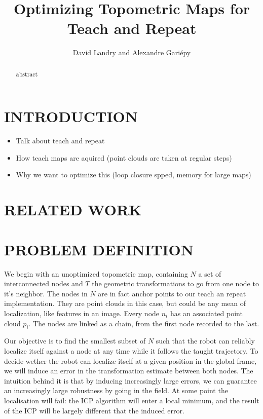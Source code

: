 \documentclass[letterpaper,10 pt,conference]{ieeeconf}
\title{\LARGE \bf
  Optimizing Topometric Maps for Teach and Repeat
}
\author{David Landry and Alexandre Gari\'epy}
\begin{document}
\maketitle
\thispagestyle{empty}
\pagestyle{empty}


\begin{abstract}

  abstract

\end{abstract}

\section{INTRODUCTION}



\begin{itemize}
    \item Talk about teach and repeat
    \item How teach maps are aquired (point clouds are taken at regular steps)
    \item Why we want to optimize this (loop closure spped, memory for large maps)
\end{itemize}


\section{RELATED WORK}


\section{PROBLEM DEFINITION}

We begin with an unoptimized topometric map, containing $N$ a set of interconnected nodes and $T$
the geometric transformations to go from one node to it's neighbor. The nodes in $N$ are in fact
anchor points to our teach an repeat implementation. They are point clouds in this case, but could
be any mean of localization, like features in an image. Every node $n_i$ has an associated point
cloud $p_i$. The nodes are linked as a chain, from the first node recorded to the last.

Our objective is to find the smallest subset of $N$ such that the robot can reliably localize itself
against a node at any time while it follows the taught trajectory. To decide wether the robot can
localize itself at a given position in the global frame, we will induce an error in the
transformation estimate between both nodes. The intuition behind it is that by inducing increasingly
large errors, we can guarantee an increasingly large robustness by going in the field. At some point
the localisation will fail: the ICP algorithm will enter a local minimum, and the result of the ICP
will be largely different that the induced error.
\end{document}
